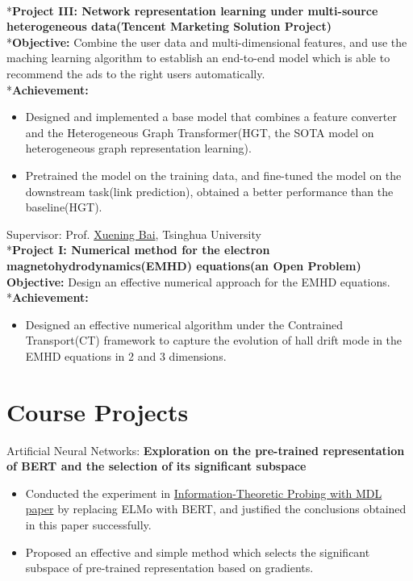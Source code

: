\documentclass{resume}
\begin{document}
\\*\textbf{Project III: Network representation learning under multi-source heterogeneous data(Tencent Marketing Solution Project)}
\\*\textbf{Objective:} Combine the user data and multi-dimensional features, and use the maching learning algorithm to establish an end-to-end model which is able to recommend the ads to the right users automatically. 
\\*\textbf{Achievement:}
\begin{itemize}
  \item Designed and implemented a base model that combines a feature converter and the Heterogeneous Graph Transformer(HGT, the SOTA model on heterogeneous graph representation learning). 
  \item Pretrained the model on the training data, and fine-tuned the model on the downstream task(link prediction), obtained a better performance than the baseline(HGT).
\end{itemize}






Supervisor: Prof. \href{http://astro.tsinghua.edu.cn/~xbai/}{Xuening Bai}, Tsinghua University
\\*\textbf{Project I: Numerical method for the electron magnetohydrodynamics(EMHD) equations(an Open Problem)}
\textbf{Objective:} Design an effective numerical approach for the EMHD equations.
\\*\textbf{Achievement:}
\begin{itemize}
    \item Designed an effective numerical algorithm under the Contrained Transport(CT) framework to capture the evolution of hall drift mode in the EMHD equations in 2 and 3 dimensions.
\end{itemize}


\section{Course Projects}
Artificial Neural Networks: \textbf{Exploration on the pre-trained representation of BERT and the selection of its significant subspace}
\begin{itemize}
    \item Conducted the experiment in \href{https://lena-voita.github.io/posts/mdl_probes.html}{Information-Theoretic Probing with MDL paper} by replacing ELMo with BERT, and justified the conclusions obtained in this paper successfully.
    \item Proposed an effective and simple method which selects the significant subspace of pre-trained representation based on gradients.
\end{itemize}
\end{document}

